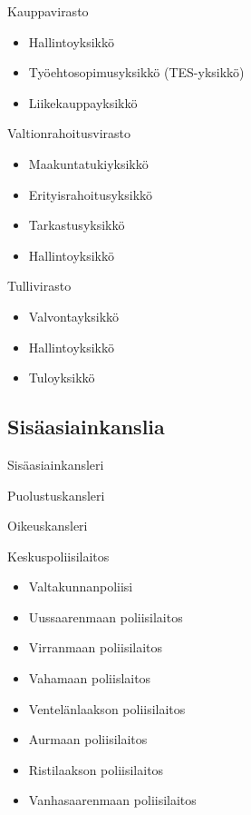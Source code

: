 \documentclass{article}
\begin{document}
	\vspace{12pt}
	Kauppavirasto
	\begin{itemize}
		\item Hallintoyksikkö
		\item Työehtosopimusyksikkö (TES-yksikkö)
		\item Liikekauppayksikkö
	\end{itemize}
	
	\vspace{12pt}
	
	Valtionrahoitusvirasto
	\begin{itemize}
		\item Maakuntatukiyksikkö
		\item Erityisrahoitusyksikkö
		\item Tarkastusyksikkö
		\item Hallintoyksikkö
	\end{itemize}
	
	\vspace{12pt}
	
	Tullivirasto
	\begin{itemize}
		\item Valvontayksikkö
		\item Hallintoyksikkö
		\item Tuloyksikkö
	\end{itemize}

	\subsection{Sisäasiainkanslia}
	Sisäasiainkansleri
	
	\vspace{12pt}
	
	Puolustuskansleri
	
	\vspace{12pt}
	
	Oikeuskansleri
	
	\vspace{12pt}
	
	Keskuspoliisilaitos
	\begin{itemize}
		\item Valtakunnanpoliisi
		\item Uussaarenmaan poliisilaitos
		\item Virranmaan poliisilaitos
		\item Vahamaan poliislaitos
		\item Ventelänlaakson poliisilaitos
		\item Aurmaan poliisilaitos
		\item Ristilaakson poliisilaitos
		\item Vanhasaarenmaan poliisilaitos
	\end{itemize}
\end{document}
